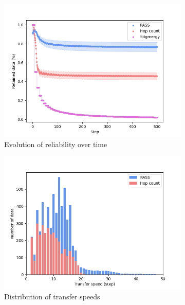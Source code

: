 \documentclass[sigconf]{aamas}
\begin{document}
\begin{figure}
    \centering
    \begin{subfigure}{0.30\textwidth}
        \includegraphics[width=\textwidth]{figures/grid_reliability.png}
        \caption{Evolution of reliability over time}
        \label{results:grid_100_reliability}
    \end{subfigure}
    \begin{subfigure}{0.30\textwidth}
        \includegraphics[width=\textwidth]{figures/grid_speed.png}
        \caption{Distribution of transfer speeds}
        \label{results:grid_100_speed}
    \end{subfigure}
    \begin{subfigure}{0.30\textwidth}

\end{subfigure}
\end{figure}
\end{document}
